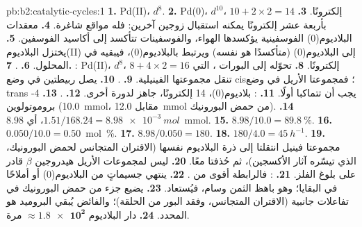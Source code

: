 \begin{solution}{pb:b2:catalytic-cycles:1}
\textbf{1.} Pd(II)، $d^8$.
\textbf{2.} Pd(0)، $d^{10}$، $10 + 2 \times 2 = 14$ إلكترونًا.
\textbf{3.} بأربعة عشر إلكترونًا يمكنه استقبال زوجين آخرين: فله مواقع شاغرة.
\textbf{4.} معقدات البلاديوم(0) الفوسفينية يؤكسدها الهواء، والفوسفينات
تتأكسد إلى أكاسيد الفوسفين.
\textbf{5.} يختزل البلاديوم(II) إلى البلاديوم(0) (متأكسدًا هو نفسه) ويرتبط
بالبلاديوم(0)، فيبقيه في المحلول.
\textbf{6.} .
\textbf{7.} : Pd(II)، $d^8$، $8 + 4 \times 2 =
16$ إلكترونًا.
\textbf{8.} تحوّله إلى البورات ، التي تنقل مجموعتها الفينيلية.
\textbf{9.} .
\textbf{10.}  يصل ربيطتين في وضع cis؛ فمجموعتا الأريل في وضع trans يجب أن تتماكبا أولًا.
\textbf{11.} : بلاديوم(0)، 14 إلكترونًا، جاهز
لدورة أخرى.
\textbf{12.} .
\textbf{13.} 4-بروموتولوين (\qty{10.0}{mmol}، مقابل \qty{12.0}{mmol} من حمض البورونيك).
\textbf{14.} $1.51/168.24 = \qty{8.98e-3}{mol}$، أي \qty{8.98}{mmol}.
\textbf{15.} $8.98/10.0 = 89.8~\%$.
\textbf{16.} $0.050/10.0 = 0.50$~mol~\%.
\textbf{17.} $8.98/0.050 = 180$.
\textbf{18.} $180/4.0 = \qty{45}{h^{-1}}$.
\textbf{19.} مجموعتا فينيل انتقلتا إلى ذرة البلاديوم نفسها (الاقتران المتجانس لحمض
البورونيك، الذي تيسّره آثار الأكسجين)، ثم حُذفتا معًا.
\textbf{20.} ليس لمجموعات الأريل هيدروجين $\beta$ قادر على بلوغ الفلز.
\textbf{21.} : فالرابطة  أقوى من .
\textbf{22.} ينتهي جسيماتٍ من البلاديوم(0) أو أملاحًا في البقايا؛ وهو باهظ الثمن 
وسام، فيُستعاد.
\textbf{23.} يضيع جزء من حمض البورونيك في تفاعلات جانبية (الاقتران المتجانس، وفقد البور
من الحلقة)؛ والفائض يُبقي البروميد هو المحدد.
\textbf{24.} دار البلاديوم $\boldsymbol{\approx \num{1.8e2}}$ مرة.
\end{solution}
